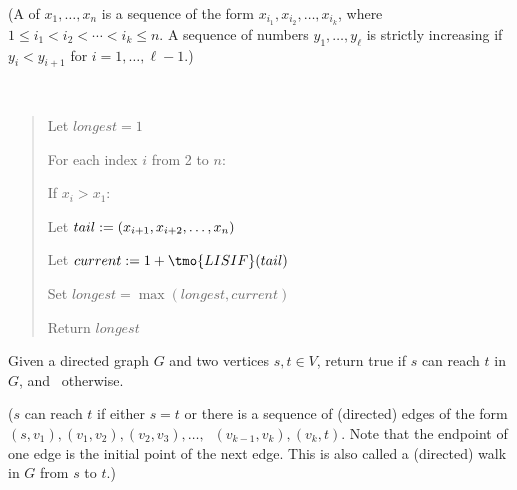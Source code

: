 \documentclass[10pt]{article}
\newcommand{\parof}[1]{\mleft( #1 \mright)}
\begin{document}
(A  of \( x_1, \ldots, x_n \) is a sequence of the form \( x_{i_1}, x_{i_2}, \ldots, x_{i_k} \), where \( 1\leq i_1<i_2<\cdots<i_k\leq n \). A sequence of numbers \( y_1, \ldots, y_\ell \) is strictly increasing if \( y_i < y_{i+1} \) for \( i = 1, \ldots, \ell-1 \).)

\begin{solution}\ %
\begin{quote}%
\noindent{} %

%

\begin{steps}
  \item Let \( longest = 1 \)
  \item For each index \( i \) from 2 to \( n \):
    \begin{steps}
    \item If \( x_i > x_1 \):
      \begin{steps}
      \item Let \( tail := \parof{x_{i+1}, x_{i+2}, \ldots, x_n} \)
      \item Let \( current := 1 + \tmo{LISIF}(tail) \)
      \item Set \( longest = \max(longest, current) \)
      \end{steps}
    \end{steps}
    \item Return \( longest \)
  \end{steps}
\end{quote}%
\end{solution}%
\pagebreak

Given a directed graph \( G \) and two vertices \( s, t \in V \), return true if \( s \) can reach \( t \) in \( G \), and \boolF~otherwise.

(\( s \) can reach \( t \) if either \( s = t \) or there is a sequence of (directed) edges of the
form \( (s, v_1), (v_1, v_2), (v_2, v_3), \ldots, \) \( \ (v_{k-1}, v_k), (v_k, t) \). Note that the endpoint of one
edge is the initial point of the next edge. This is also called a (directed) walk in \( G \) from \( s \) to \( t \).)
\end{document}
